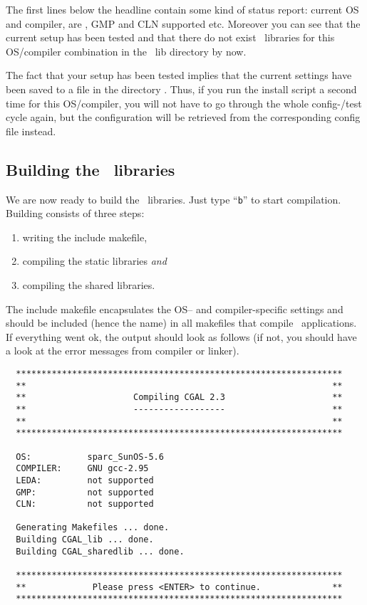 The first lines below the headline contain some kind of status report:
current OS and compiler, are \leda, GMP and CLN supported etc.
Moreover you can see that the current setup has been tested and that
there do not exist \cgal\ libraries for this OS/compiler combination
in the \cgal\ lib directory by now.

The fact that your setup has been tested implies that the current
settings have been saved to a file in the directory \cgalinstconfdir.
Thus, if you run the install script a second time for this
OS/compiler, you will not have to go through the whole config-/test
cycle again, but the configuration will be retrieved from the
corresponding config file instead.

\subsection{Building the \cgal\ libraries}\label{sec:build-the-libs}

We are now ready to build the \cgal\ libraries.  Just type ``{\tt b}''
to start compilation. Building consists of three steps:
\begin{enumerate}
\item writing the include makefile,
\item compiling the static libraries \textit{and}
\item compiling the shared libraries.
\end{enumerate}
The include makefile encapsulates the OS-- and
compiler-specific settings and should be included (hence the name) in
all makefiles that compile \cgal\ applications. If everything went ok,
the output should look as follows (if not, you should have a look at
the error messages from compiler or linker).

{\ccTexHtml{\scriptsize}{}
\begin{verbatim}
  ****************************************************************
  **                                                            **
  **                     Compiling CGAL 2.3                     **
  **                     ------------------                     **
  **                                                            **
  ****************************************************************

  OS:           sparc_SunOS-5.6
  COMPILER:     GNU gcc-2.95
  LEDA:         not supported
  GMP:          not supported
  CLN:          not supported

  Generating Makefiles ... done.
  Building CGAL_lib ... done.
  Building CGAL_sharedlib ... done.

  ****************************************************************
  **             Please press <ENTER> to continue.              **
  ****************************************************************
\end{verbatim}}
  
